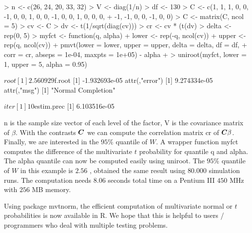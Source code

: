 \documentclass[11pt]{amsart}
\newcommand{\C}{\mbox{\boldmath $C$}}
\begin{document}
\begin{Schunk}
\begin{Sinput}
> n <- c(26, 24, 20, 33, 32)
> V <- diag(1/n)
> df <- 130
> C <- c(1, 1, 1, 0, 0, -1, 0, 0, 1, 0, 0, -1, 0, 0, 1, 0, 0, 0, 
+     -1, -1, 0, 0, -1, 0, 0)
> C <- matrix(C, ncol = 5)
> cv <- C %*% V %*% t(C)
> dv <- t(1/sqrt(diag(cv)))
> cr <- cv * (t(dv) %*% dv)
> delta <- rep(0, 5)
> myfct <- function(q, alpha) {
+     lower <- rep(-q, ncol(cv))
+     upper <- rep(q, ncol(cv))
+     pmvt(lower = lower, upper = upper, delta = delta, df = df, 
+         corr = cr, abseps = 1e-04, maxpts = 1e+05) - alpha
+ }
> uniroot(myfct, lower = 1, upper = 5, alpha = 0.95)
\end{Sinput}
\begin{Soutput}
$root
[1] 2.560929

$f.root
[1] -1.932693e-05
attr(,"error")
[1] 9.274334e-05
attr(,"msg")
[1] "Normal Completion"

$iter
[1] 10

$estim.prec
[1] 6.103516e-05
\end{Soutput}
\end{Schunk}
{\ttfamily n} is the sample size vector of each level of the
factor, {\ttfamily V} is the covariance matrix of $ \beta $. With
the contrasts $ \C $ we can compute the correlation matrix
{\ttfamily cr} of $ \C\beta $. Finally, we are interested in the
$ 95\%$ quantile of $ W $. A wrapper function {\ttfamily myfct}
computes the difference of the multivariate $ t $ probability for
quantile {\ttfamily q} and {\ttfamily alpha}. The {\ttfamily
alpha} quantile can now be computed easily using {\ttfamily
uniroot}. The $95\%$ quantile of $ W $ in this example is $ 2.56 $
, \cite{the-effici:1987} obtained the same result using $ 80.000
$ simulation runs. The computation needs $ 8.06 $ seconds total
time on a Pentium III $450$ MHz with $256$ MB memory.

Using package {\ttfamily mvtnorm}, the efficient computation of
multivariate normal or $ t $ probabilities is now available
in {\ttfamily R}. We hope that this is helpful to users / programmers who
deal with multiple testing problems.



\end{document}
